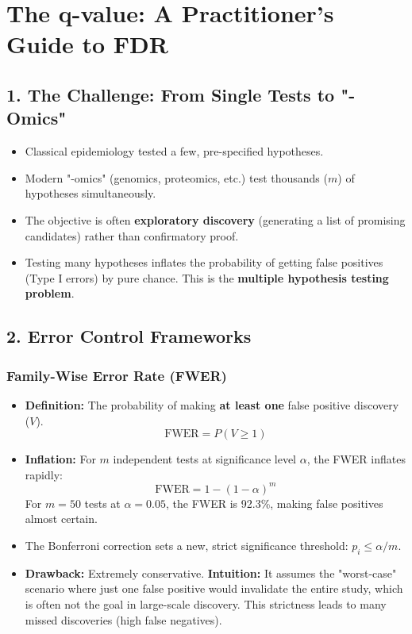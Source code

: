 \documentclass{article}
\begin{document}
\section*{The q-value: A Practitioner's Guide to FDR}

\subsection*{1. The Challenge: From Single Tests to "-Omics"}
\begin{itemize}
    \item Classical epidemiology tested a few, pre-specified hypotheses.
    \item Modern "-omics" (genomics, proteomics, etc.) test thousands ($m$) of hypotheses simultaneously.
    \item The objective is often \textbf{exploratory discovery} (generating a list of promising candidates) rather than confirmatory proof.
    \item Testing many hypotheses inflates the probability of getting false positives (Type I errors) by pure chance. This is the \textbf{multiple hypothesis testing problem}.
\end{itemize}

\subsection*{2. Error Control Frameworks}
\subsubsection*{Family-Wise Error Rate (FWER)}
\begin{itemize}
    \item \textbf{Definition:} The probability of making \textbf{at least one} false positive discovery ($V$).
    $$ \text{FWER} = P(V \ge 1) $$
    \item \textbf{Inflation:} For $m$ independent tests at significance level $\alpha$, the FWER inflates rapidly:
    $$ \text{FWER} = 1 - (1-\alpha)^m $$
    For $m=50$ tests at $\alpha=0.05$, the FWER is 92.3\%, making false positives almost certain.
    \item The Bonferroni correction sets a new, strict significance threshold: $p_i \le \alpha/m$.
    \item \textbf{Drawback:} Extremely conservative. \textbf{Intuition:} It assumes the "worst-case" scenario where just one false positive would invalidate the entire study, which is often not the goal in large-scale discovery. This strictness leads to many missed discoveries (high false negatives).
\end{itemize}
\end{document}
